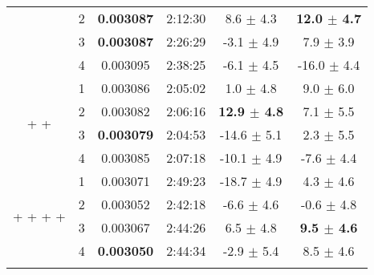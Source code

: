 \begin{table}[H]
\begin{adjustbox}{center}
\begin{tabular}{@{} cccc|cc @{}}
 & 2 & \bf0.003087 & 2:12:30 & 8.6 $\pm$ 4.3 & \bf12.0 $\pm$ 4.7\\
 & 3 & \bf0.003087 & 2:26:29 & -3.1 $\pm$ 4.9 & 7.9 $\pm$ 3.9\\
 & 4 & 0.003095 & 2:38:25 & -6.1 $\pm$ 4.5 & -16.0 $\pm$ 4.4\\
\midrule
{} & 1 & 0.003086 & 2:05:02 & 1.0 $\pm$ 4.8 & 9.0 $\pm$ 6.0\\
 & 2 & 0.003082 & 2:06:16 & \bf12.9 $\pm$ 4.8 & 7.1 $\pm$ 5.5\\
 & 3 & \bf0.003079 & 2:04:53 & -14.6 $\pm$ 5.1 & 2.3 $\pm$ 5.5\\
 & 4 & 0.003085 & 2:07:18 & -10.1 $\pm$ 4.9 & -7.6 $\pm$ 4.4\\
\midrule
{} & 1 & 0.003071 & 2:49:23 & -18.7 $\pm$ 4.9 & 4.3 $\pm$ 4.6\\
 & 2 & 0.003052 & 2:42:18 & -6.6 $\pm$ 4.6 & -0.6 $\pm$ 4.8\\
 & 3 & 0.003067 & 2:44:26 & 6.5 $\pm$ 4.8 & \bf9.5 $\pm$ 4.6\\
 & 4 & \bf0.003050 & 2:44:34 & -2.9 $\pm$ 5.4 & 8.5 $\pm$ 4.6\\
\toprule
{} \\
\end{tabular}
\end{adjustbox}
\end{table}
